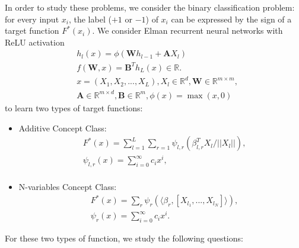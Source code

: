 \documentclass{article}
\begin{document}
In order to study these problems, we consider the binary classification  problem: for every input $x_i$, the label ($+1$ or $-1$) of $x_i$ can be expressed by the sign of a target function  $F^*(x_i)$.  We consider Elman recurrent neural networks with ReLU activation
\begin{equation}\label{rnn}
\begin{aligned}
&h_{l}(x)=\phi(\bm{W}h_{l-1}+\bm{A}X_l)\\
&f(\bm{W},x)=\bm{B}^Th_L(x)\in\mathbb{R}.\\
&x=(X_1,X_2,...,X_L),X_l\in\mathbb{R}^d,\bm{W}\in\mathbb{R}^{m\times m},\\
&\bm{A}\in\mathbb{R}^{m\times d},\bm{B}\in\mathbb{R}^m,\phi(x)=\max (x,0)
\end{aligned}
\end{equation} to learn two types of target functions:
\begin{itemize}
\item[$\bullet$]{ Additive Concept Class:}
\begin{equation}\label{cc1}
\begin{aligned}
&F^*(x)=\sum_{l=1}^{L} \sum_{r=1} \psi_{l,r}(\beta^T_{l,r}X_l/||X_l||),\\
&\psi_{l,r}(x)=\sum_{i=0}^\infty c_ix^{i},\\
\end{aligned}
\end{equation}
\item[$\bullet$]{N-variables Concept Class:}
\begin{equation}\label{cc2}
\begin{aligned}
&F^*(x)=\sum_{r}\psi_{r}(\langle \beta_{r}, [X_{l_1},...,X_{l_{N}}]\rangle),\\
&\psi_{r}(x)=\sum_{i=0}^\infty c_ix^{i}.
\end{aligned}
\end{equation}
\end{itemize}
For these two types of function,  we study the following  questions:
\end{document}
